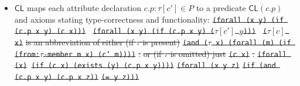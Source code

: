 \documentclass[10pt,fleqn,final]{scrreprt}
\newcommand*{\CL}{\ensuremath{\mathsf{CL}}\xspace}
\newcommand{\white}[1]{{\color{white}{#1}}}
\newcommand{\qqquad}{\white{x}\qquad}
\providecommand{\DIFdel}[1]{{\protect\color{red}\sout{#1}}}                      %
\providecommand{\DIFdelbegin}{} %
\begin{document}
\begin{itemize}[topsep=0pt, label=--, leftmargin=*]
  \item $\CL$
maps each attribute declaration $c.p : \tau[c'] \in P$
to a predicate $\CL(c.p)$
and axioms stating type-correctness and functionality:
\DIFdelbegin %
\texttt{\DIFdel{(forall (x y) (if (c.p x y) (c x))) }}
\texttt{\DIFdel{(forall (x y) (if (c.p x y) ($\tau[c']$ $y$))) }}%
\texttt{\DIFdel{($\tau[c]$ x)}} %
\DIFdel{is an abbreviation of either (if $\tau$ is present) }%
\texttt{\DIFdel{(and ($\tau$ x) (forall (m) (if (from:$\tau$-member m x) (c' m))))}}%
\DIFdel{.}%
\DIFdel{or (if $\tau$ is omitted) just }\texttt{\DIFdel{(c x)}}%
\DIFdel{.}%
\texttt{\DIFdel{(forall (x)}%
\DIFdel{(if (c x) (exists (y) (c.p x y))))}}
\texttt{\DIFdel{(forall (x y z)}}%
\texttt{\DIFdel{(if (and (c.p x y) (c.p x z))}}%
\texttt{\DIFdel{(= y z)))}}

\end{itemize}
\end{document}
